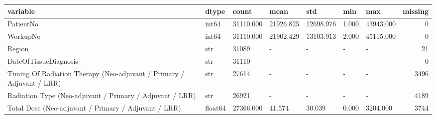 \begin{tabular}{lllllllr}
\toprule
variable & dtype & count & mean & std & min & max & missing \\
\midrule
PatientNo & int64 & 31110.000 & 21926.825 & 12698.976 & 1.000 & 43943.000 & 0 \\
WorkupNo & int64 & 31110.000 & 21902.429 & 13103.913 & 2.000 & 45115.000 & 0 \\
Region & str & 31089 & - & - & - & - & 21 \\
DateOfTissueDiagnosis & str & 31110 & - & - & - & - & 0 \\
Timing Of Radiation Therapy (Neo-adjuvant / Primary / Adjuvant / LRR) & str & 27614 & - & - & - & - & 3496 \\
Radiation Type (Neo-adjuvant / Primary / Adjuvant / LRR) & str & 26921 & - & - & - & - & 4189 \\
Total Dose (Neo-adjuvant / Primary / Adjuvant / LRR) & float64 & 27366.000 & 41.574 & 30.039 & 0.000 & 3204.000 & 3744 \\
\bottomrule
\end{tabular}
